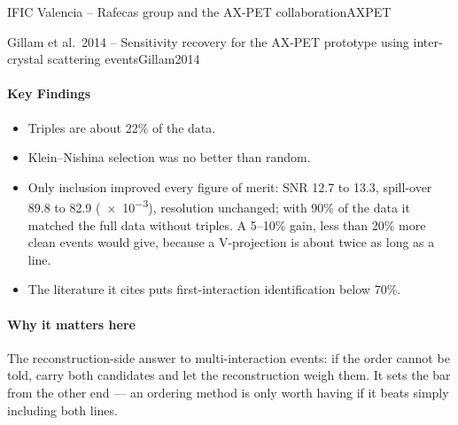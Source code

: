 \begin{programnote}{IFIC Valencia -- Rafecas group and the AX-PET collaboration}{AXPET}
\begin{papernote}{Gillam et al.\ 2014 -- Sensitivity recovery for the AX-PET prototype using inter-crystal scattering events}{Gillam2014}
\paragraph{Key Findings}
\begin{itemize}
	\item Triples are about 22\% of the data.
	\item Klein--Nishina selection was no better than random.
	\item Only inclusion improved every figure of merit: SNR 12.7 to 13.3,
		spill-over 89.8 to 82.9 (\num{e-3}), resolution unchanged; with 90\%
		of the data it matched the full data without triples. A 5--10\% gain,
		less than 20\% more clean events would give, because a V-projection is
		about twice as long as a line.
	\item The literature it cites puts first-interaction identification below
		70\%.
\end{itemize}

\paragraph{Why it matters here}
The reconstruction-side answer to multi-interaction events: if the order
cannot be told, carry both candidates and let the reconstruction weigh them.
It sets the bar from the other end --- an ordering method is only worth having
if it beats simply including both lines.
\end{papernote}

\end{programnote}



